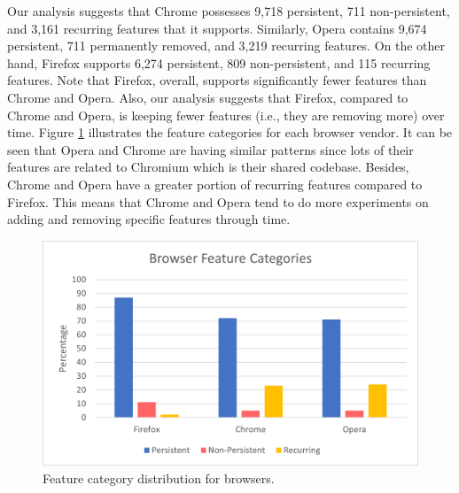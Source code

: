 Our analysis suggests that Chrome possesses 9,718 persistent, 711
non-persistent, and 3,161 recurring features that it supports. Similarly,
Opera contains 9,674 persistent, 711 permanently removed, and 3,219 recurring
features. On the other hand, Firefox supports 6,274 persistent, 809 non-persistent, and
115 recurring features. Note that Firefox, overall, supports significantly fewer
features than Chrome and Opera. Also, our analysis suggests that Firefox,
compared to Chrome and Opera, is keeping fewer features (i.e., they are removing
more) over time. Figure \ref{fig:feature-categories} illustrates the feature categories for
each browser vendor. It can be seen that Opera and Chrome are having similar patterns since
lots of their features are related to Chromium which is their shared codebase.
Besides, Chrome and Opera have a greater portion of recurring features compared to Firefox.
This means that Chrome and Opera tend to do more experiments
on adding and removing specific features through time.

\begin{figure}[ht]
  \centering
  \includegraphics[width=.9\columnwidth]{figures/feature-categories-bar.png}
  \caption{Feature category distribution for browsers.}
  \label{fig:feature-categories}
\end{figure}




